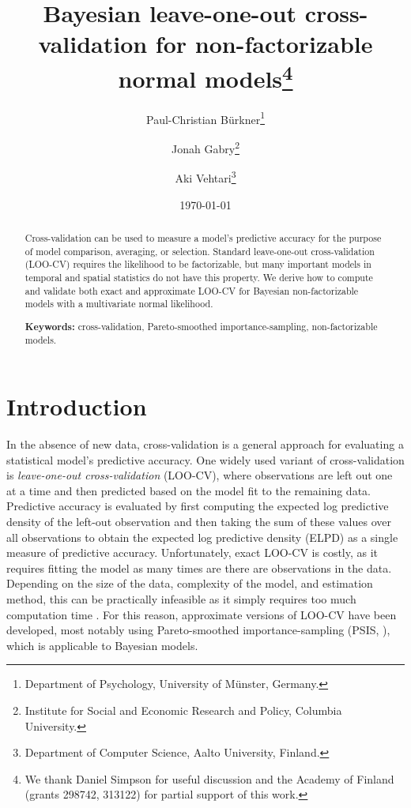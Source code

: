 \documentclass[11pt]{article}
\title{\bf Bayesian leave-one-out cross-validation for non-factorizable normal models\footnote{
We thank Daniel Simpson for useful discussion and the Academy of Finland
(grants 298742, 313122) for partial support of this work.
}\vspace{.1in}}
\author{Paul-Christian B\"{u}rkner\footnote{Department of Psychology, University of M\"{u}nster, Germany.}
  \and Jonah Gabry\footnote{Institute for Social and Economic Research and Policy, Columbia University.}
  \and Aki Vehtari\footnote{Department of Computer Science, Aalto University, Finland.
}\vspace{.1in}}
\date{\today \vspace{-.1in}}
\begin{document}
\sloppy
\maketitle
\thispagestyle{empty}

\begin{abstract}
Cross-validation can be used to measure a model's predictive accuracy for the
purpose  of model comparison, averaging, or selection. Standard leave-one-out
cross-validation  (LOO-CV) requires the likelihood to be factorizable, but many
important models in temporal  and spatial statistics do not have this property.
We derive how to compute and validate  both exact and approximate LOO-CV for
Bayesian non-factorizable models with a multivariate  normal likelihood.

\textbf{Keywords:} cross-validation, Pareto-smoothed importance-sampling,
  non-factorizable models.
\end{abstract}


\section{Introduction}


In the absence of new data, cross-validation is a general approach for evaluating
a statistical model's predictive accuracy. One widely used variant of
cross-validation is \emph{leave-one-out cross-validation} (LOO-CV), where
observations are left out one at a time and then predicted based on the model
fit to the remaining data. Predictive accuracy is evaluated by first computing
the expected log predictive density of the left-out observation and then taking
the sum of these values over all observations to obtain the expected log
predictive density (ELPD) as a single measure of predictive accuracy.
Unfortunately, exact LOO-CV is costly, as it requires fitting the model as many
times are there are observations in the data. Depending on the size of the data,
complexity of the model, and estimation method, this can be practically
infeasible as it simply requires too much computation time
\citep{vehtari2017loo}. For this reason, approximate versions of LOO-CV have
been developed, most notably using Pareto-smoothed importance-sampling (PSIS,
\cite{vehtari2017loo, vehtari2017psis}), which is applicable to Bayesian models.
\end{document}
